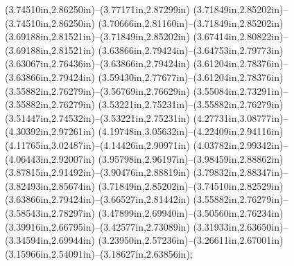 (3.74510in,2.86250in)--(3.77171in,2.87299in) (3.71849in,2.85202in)--(3.74510in,2.86250in) (3.70666in,2.81160in)--(3.71849in,2.85202in) (3.69188in,2.81521in)--(3.71849in,2.85202in) (3.67414in,2.80822in)--(3.69188in,2.81521in) (3.63866in,2.79424in)--(3.64753in,2.79773in) (3.63067in,2.76436in)--(3.63866in,2.79424in) (3.61204in,2.78376in)--(3.63866in,2.79424in) (3.59430in,2.77677in)--(3.61204in,2.78376in) (3.55882in,2.76279in)--(3.56769in,2.76629in) (3.55084in,2.73291in)--(3.55882in,2.76279in) (3.53221in,2.75231in)--(3.55882in,2.76279in) (3.51447in,2.74532in)--(3.53221in,2.75231in) (4.27731in,3.08777in)--(4.30392in,2.97261in) (4.19748in,3.05632in)--(4.22409in,2.94116in) (4.11765in,3.02487in)--(4.14426in,2.90971in) (4.03782in,2.99342in)--(4.06443in,2.92007in) (3.95798in,2.96197in)--(3.98459in,2.88862in) (3.87815in,2.91492in)--(3.90476in,2.88819in) (3.79832in,2.88347in)--(3.82493in,2.85674in) (3.71849in,2.85202in)--(3.74510in,2.82529in) (3.63866in,2.79424in)--(3.66527in,2.81442in) (3.55882in,2.76279in)--(3.58543in,2.78297in) (3.47899in,2.69940in)--(3.50560in,2.76234in) (3.39916in,2.66795in)--(3.42577in,2.73089in) (3.31933in,2.63650in)--(3.34594in,2.69944in) (3.23950in,2.57236in)--(3.26611in,2.67001in) (3.15966in,2.54091in)--(3.18627in,2.63856in);
